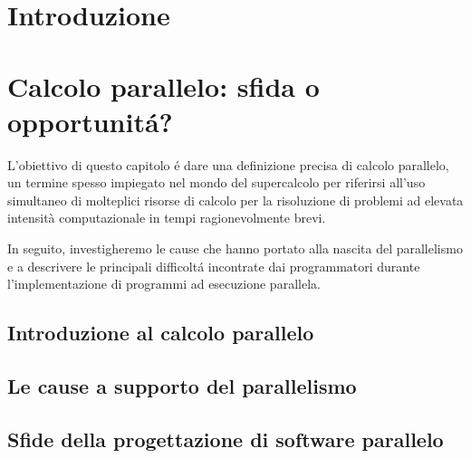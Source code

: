\documentclass[
	a4paper,
	twoside,
	12pt
]{book}
\begin{document}
\frontmatter


\tableofcontents

\mainmatter
\chapter*{Introduzione}

\chapter{Calcolo parallelo: sfida o opportunit\'a?}
\label{cap1}
L'obiettivo di questo capitolo \'e dare una definizione precisa di calcolo parallelo, un termine spesso impiegato nel mondo
del supercalcolo per riferirsi all’uso simultaneo di molteplici risorse di calcolo per la risoluzione di problemi ad elevata intensità computazionale in tempi ragionevolmente brevi.

In seguito, investigheremo le cause che hanno portato alla nascita del parallelismo e a descrivere le principali difficolt\'a incontrate dai programmatori durante l'implementazione di programmi ad esecuzione parallela.
\section{Introduzione al calcolo parallelo}
\label{par1.1}


\section{Le cause a supporto del parallelismo}
\label{par1.2}

\section{Sfide della progettazione di software parallelo}
\label{par1.3}

\backmatter



\end{document}
